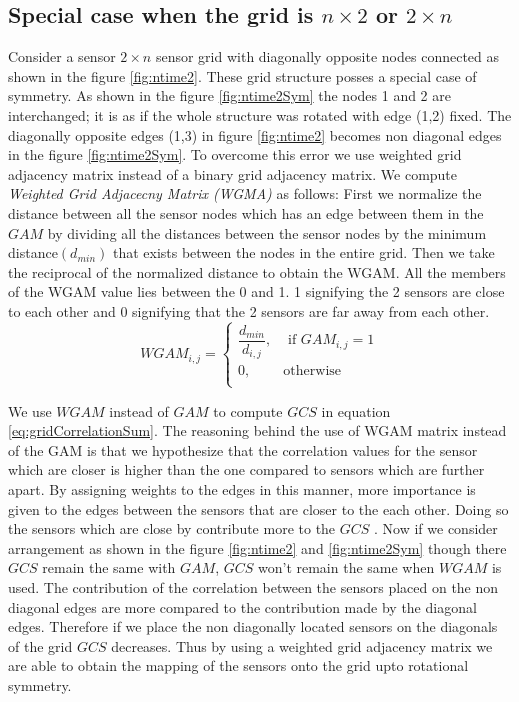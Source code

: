 \subsection{Special case when the grid is $n \times 2$ or $2 \times n$}
Consider a sensor $2 \times n$ sensor grid with diagonally opposite nodes connected as shown in the figure \ref{fig:ntime2}. These grid structure posses a special case of symmetry. As shown in the  figure \ref{fig:ntime2Sym} the nodes 1 and 2 are interchanged; it is as if the whole structure was rotated with  edge (1,2) fixed. The diagonally opposite edges (1,3) in figure \ref{fig:ntime2} becomes non diagonal edges in the figure \ref{fig:ntime2Sym}. To overcome this error we use weighted grid adjacency matrix instead of a binary grid adjacency matrix. We compute \textit{Weighted Grid Adjacecny Matrix (WGMA)} as follows:
First we normalize the distance between all the sensor nodes which has an edge between them in the $GAM$ by dividing all the distances between the sensor nodes by the minimum distance$(d_{min})$ that exists between the nodes in the entire grid. Then we take the reciprocal of the normalized distance to obtain the WGAM. All the members of the WGAM value lies between the 0 and 1. 1 signifying the 2 sensors are close to each other and 0 signifying that the 2 sensors are far away from each other.\\
\[
WGAM_{i,j} = 
\begin{cases}
\dfrac{d_{min}}{d_{i,j}}, &\text{ if } GAM_{i,j} = 1\\
0, & \text{otherwise}\\
\end{cases}
\]


We use $WGAM$ instead of $GAM$ to compute $GCS$ in equation \ref{eq:gridCorrelationSum}. The reasoning behind the use of WGAM matrix instead of the GAM is that we hypothesize that the correlation values for the sensor which are closer is higher than the one compared to sensors which are further apart. By assigning weights to the edges in this manner, more importance is given to the edges between the sensors that are closer to the each other. Doing so the sensors which are close by contribute  more to the $GCS$ . 
Now if we consider arrangement as shown in the figure \ref{fig:ntime2} and \ref{fig:ntime2Sym} though there $GCS$ remain the same with $GAM$, $GCS$ won't remain the same when $WGAM$ is used. The contribution of the correlation between the sensors placed on the non diagonal edges are more compared to the contribution made by the diagonal edges. Therefore if we place the non diagonally located sensors on the diagonals of the grid $GCS$ decreases. Thus by using a weighted grid adjacency matrix we are able to obtain the mapping of the sensors onto the grid upto rotational symmetry.

